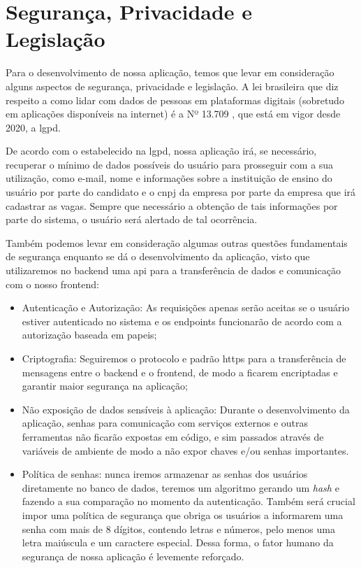 \section{Segurança, Privacidade e Legislação}
Para o desenvolvimento de nossa aplicação, temos que levar em consideração  alguns aspectos de segurança, privacidade e legislação.
A lei brasileira que diz respeito a como lidar com dados de pessoas em plataformas digitais (sobretudo em aplicações disponíveis na internet) é a Nº 13.709 \cite{lgpd},
que está em vigor desde 2020, a \gls{lgpd}.

De acordo com o estabelecido na \gls{lgpd}, nossa aplicação irá, se necessário, recuperar o mínimo de dados possíveis do usuário para prosseguir com a sua utilização, como e-mail, nome
e informações sobre a instituição de ensino do usuário por parte do candidato e o \ac{cnpj} da empresa por parte da empresa que irá cadastrar as vagas. Sempre que necessário a obtenção de tais informações
por parte do sistema, o usuário será alertado de tal ocorrência.

Também podemos levar em consideração algumas outras questões fundamentais de segurança enquanto se dá o desenvolvimento da aplicação, visto que utilizaremos no \gls{backend} uma \gls{api} para a transferência de 
dados e comunicação com o nosso \gls{frontend}:
\begin{itemize}
	\item Autenticação e Autorização: As requisições apenas serão aceitas se o usuário estiver autenticado no sistema e os \glspl{endpoint} funcionarão de acordo com a autorização baseada em papeis;
	\item Criptografia: Seguiremos o protocolo e padrão \gls{https} para a transferência de mensagens entre o \gls{backend} e o \gls{frontend}, de modo a ficarem encriptadas e garantir maior segurança na aplicação;
	\item Não exposição de dados sensíveis à aplicação: Durante o desenvolvimento da aplicação, senhas para comunicação com serviços externos e outras ferramentas não ficarão expostas em código, e sim passados
	através de variáveis de ambiente de modo a não expor chaves e/ou senhas importantes.
	\item Política de senhas: nunca iremos armazenar as senhas dos usuários diretamente no banco de dados, teremos um algoritmo gerando um \textit{hash} e fazendo a sua comparação no momento da autenticação.
	Também será crucial impor uma política de segurança que obriga os usuários a informarem uma senha com mais de 8 dígitos, contendo letras e números, pelo menos uma letra maiúscula e um caractere especial.
	Dessa forma, o fator humano da segurança de nossa aplicação é levemente reforçado.
\end{itemize}